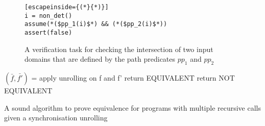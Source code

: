 \begin{figure} [h]
\begin{center}
\begin{minipage}{7 cm}
\begin{lstlisting}[escapeinside={(*}{*)}]
i = non_det()
assume(*($pp_1(i)$*) && (*($pp_2(i)$*))
assert(false)
\end{lstlisting}
\end{minipage}
\caption{A verification task for checking the intersection of two input domains that are defined by the path predicates $pp_1$ and $pp_2$}
\label{fig:checkfeasibility}
\end{center}
\end{figure}








































\iffalse
\noindent
\begin{algorithm}
\begin{minipage}{\linewidth}
\begin{algorithmic}[1]
	\State$(\bar{f},\bar{f'})$ = apply unrolling on f and f'
	\State	return EQUIVALENT
	\Else
	\State	return NOT EQUIVALENT
		\EndIf
	\EndFunction
\end{algorithmic}
\end{minipage}
\caption{A sound algorithm to prove equivalence for programs with multiple recursive calls given a synchronisation unrolling}
\label{alg:ProveWithUnrolling}
\end{algorithm}
   
